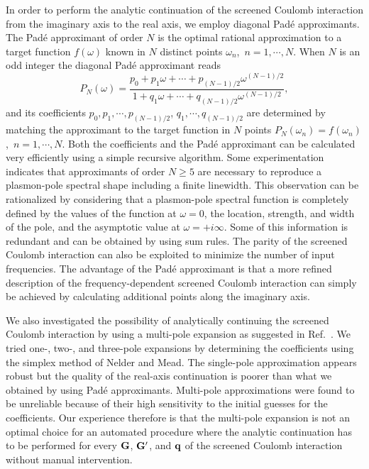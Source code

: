 \documentclass[twocolumn,prb,showpacs,superscriptaddress]{revtex4}
\def\w{\omega}
\def\q{{\bf q}}
\def\G{{\bf G}}
\def\Gp{{\bf G^\prime}}
\begin{document}
In order to perform the analytic continuation of the screened Coulomb interaction
from the imaginary axis to the real axis, we employ diagonal 
Pad\'e approximants.\cite{pade1,pade2,blochl}
The Pad\'e approximant of order $N$ is the optimal rational approximation
to a target function $f(\w)$ known in $N$ distinct points 
$\w_n$,~$n=1,\cdots,N$. 
When $N$ is an odd integer the diagonal Pad\'e approximant reads
  \begin{equation}
  P_N(\w) = \frac{p_0+p_1\w+\cdots+p_{(N-1)/2}\w^{(N-1)/2}}
  {1+q_1\w+\cdots+q_{(N-1)/2}\w^{(N-1)/2}},
  \end{equation}
and its coefficients $p_0, p_1, \cdots, p_{(N-1)/2}$, $q_1, \cdots, q_{(N-1)/2}$ are determined by matching the approximant
to the target function in $N$ points $P_N(\w_n)=f(\w_n)$,~$n=1,\cdots,N$.
Both the coefficients and the Pad\'e approximant can be calculated
very efficiently using a simple recursive algorithm.\cite{pade2}
Some experimentation indicates that approximants of order $N\ge5$ are necessary
to reproduce a plasmon-pole spectral shape including a finite linewidth.
This observation can be rationalized by considering that a plasmon-pole
spectral function is completely defined by the values of the function at $\w=0$,
the location, strength, and width of the pole, and the asymptotic value at $\w=+i\infty$.
Some of this information is redundant and can be obtained by using sum rules.\cite{hl86}
The parity of the screened Coulomb interaction can also be exploited to minimize
the number of input frequencies. 
The advantage of the Pad\'e approximant is that a more refined description
of the frequency-dependent screened Coulomb interaction can simply be achieved
by calculating additional points along the imaginary axis. 

We also investigated the possibility of analytically continuing
the screened Coulomb interaction by using a multi-pole expansion
as suggested in Ref.\ . 
We tried one-, two-, and three-pole
expansions by determining the coefficients using the simplex 
method of Nelder and Mead.\cite{nelder-mead}
The single-pole approximation appears robust but the quality
of the real-axis continuation is poorer than what we obtained
by using Pad\'e approximants. Multi-pole approximations were found
to be unreliable because of their high sensitivity to the initial guesses 
for the coefficients.
Our experience therefore is that the multi-pole expansion is not an optimal 
choice for an automated procedure where the analytic continuation has to be
performed for every $\G$, $\Gp$, and $\q$ of the screened Coulomb 
interaction without manual intervention. 
\end{document}
